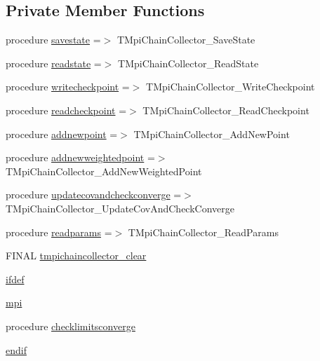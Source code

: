 \subsection*{Private Member Functions}
\begin{DoxyCompactItemize}
\item 
procedure \mbox{\hyperlink{structsamplecollector_1_1tmpichaincollector_a56b7410b8b9c4eb8a632a9554e90d4ff}{savestate}} =$>$ T\+Mpi\+Chain\+Collector\+\_\+\+Save\+State
\item 
procedure \mbox{\hyperlink{structsamplecollector_1_1tmpichaincollector_a7f5ab23432b65cc6c8f6ef072f46635b}{readstate}} =$>$ T\+Mpi\+Chain\+Collector\+\_\+\+Read\+State
\item 
procedure \mbox{\hyperlink{structsamplecollector_1_1tmpichaincollector_a41ccea8027bb976be2ef4e2d3d186bf2}{writecheckpoint}} =$>$ T\+Mpi\+Chain\+Collector\+\_\+\+Write\+Checkpoint
\item 
procedure \mbox{\hyperlink{structsamplecollector_1_1tmpichaincollector_a747a0c05013ebb3888d1e2fe52282ac1}{readcheckpoint}} =$>$ T\+Mpi\+Chain\+Collector\+\_\+\+Read\+Checkpoint
\item 
procedure \mbox{\hyperlink{structsamplecollector_1_1tmpichaincollector_a43c4fe2ce78e7de2be290a07654f4303}{addnewpoint}} =$>$ T\+Mpi\+Chain\+Collector\+\_\+\+Add\+New\+Point
\item 
procedure \mbox{\hyperlink{structsamplecollector_1_1tmpichaincollector_a98d7b311e1e178a7690e71afc27316ac}{addnewweightedpoint}} =$>$ T\+Mpi\+Chain\+Collector\+\_\+\+Add\+New\+Weighted\+Point
\item 
procedure \mbox{\hyperlink{structsamplecollector_1_1tmpichaincollector_ac62f9cbd3d3d3d1749db875d7090dd95}{updatecovandcheckconverge}} =$>$ T\+Mpi\+Chain\+Collector\+\_\+\+Update\+Cov\+And\+Check\+Converge
\item 
procedure \mbox{\hyperlink{structsamplecollector_1_1tmpichaincollector_a10b2ed8fa4ecfd4115963ff4fceeebb6}{readparams}} =$>$ T\+Mpi\+Chain\+Collector\+\_\+\+Read\+Params
\item 
F\+I\+N\+AL \mbox{\hyperlink{structsamplecollector_1_1tmpichaincollector_a12f83ab5d21b831dfdc5f8e1bff3ec85}{tmpichaincollector\+\_\+clear}}
\item 
\mbox{\hyperlink{structsamplecollector_1_1tmpichaincollector_ace9241c4d84245f04850aefdaca46a87}{ifdef}}
\item 
\mbox{\hyperlink{structsamplecollector_1_1tmpichaincollector_a8ff2fdcc114c6b054a09b10897ed1a15}{mpi}}
\item 
procedure \mbox{\hyperlink{structsamplecollector_1_1tmpichaincollector_a72992adff709c0fa0658a8fb2e947cd6}{checklimitsconverge}}
\item 
\mbox{\hyperlink{structsamplecollector_1_1tmpichaincollector_abead2713a9c1d685d8015ab02f36151f}{endif}}
\end{DoxyCompactItemize}
